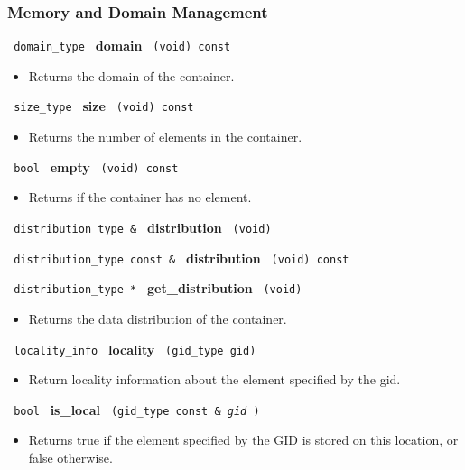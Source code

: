  
\subsubsection{Memory and Domain Management}

\noindent
\texttt{%
domain\_type 	
}
\textbf{domain}%
\texttt{%
(void) const
}

\begin{itemize}
\item
Returns the domain of the container.
\end{itemize}
 
\noindent
\texttt{%
size\_type
}
\textbf{size}%
\texttt{%
(void) const
}

\begin{itemize}
\item
Returns the number of elements in the container. 
\end{itemize}
 
\noindent
\texttt{%
bool
}
\textbf{empty}%
\texttt{%
(void) const
}

\begin{itemize}
\item
Returns if the container has no element.
\end{itemize}
 
\noindent
\texttt{%
distribution\_type \& 
}
\textbf{distribution}%
\texttt{%
 (void)
}
 
\noindent
\texttt{%
distribution\_type const \& 
}
\textbf{distribution}%
\texttt{%
 (void) const
}
 
\noindent
\texttt{%
distribution\_type *
}
\textbf{get\_distribution}%
\texttt{%
(void)
}
 
\begin{itemize}
\item
Returns the data distribution of the container.
\end{itemize}

\noindent
\texttt{%
locality\_info 
}
\textbf{locality}%
\texttt{%
 (gid\_type gid)
}

\begin{itemize}
\item
Return locality information about the element specified by the gid. 
\end{itemize}
 
\noindent
\texttt{%
bool
}
\textbf{is\_local}%
\texttt{%
(gid\_type const \&
\textit{gid}%
)
}

\begin{itemize}
\item
Returns true if the element specified by the GID is stored on this location, or false otherwise. 
\end{itemize}

